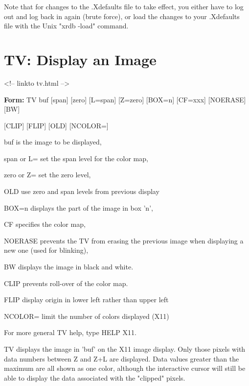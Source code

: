 Note that for changes to the .Xdefaults file to take effect, you either
have to log out and log back in again (brute force), or load the changes to
your .Xdefaults file with the Unix "xrdb -load" command.
 
\section{TV: Display an Image}
\begin{rawhtml}
<!-- linkto tv.html -->
\end{rawhtml}
\begin{command}
  \item[\textbf{Form: }TV buf {[span]} {[zero]} {[L=span]} {[Z=zero]} 
       {[BOX=n]} {[CF=xxx]} {[NOERASE]} {[BW]}\hfill]{}
  \item[{[CLIP]} {[FLIP]} {[OLD]} {[NCOLOR=]}\hfill]{}
  \item[buf]{is the image to be displayed,}
  \item[span or L=]{set the span level for the color map,}
  \item[zero or Z=]{set the zero level,}
  \item[OLD]{use zero and span levels from previous display}
  \item[BOX=n]{displays the part of the image in box 'n',}
  \item[CF]{specifies the color map,}
  \item[NOERASE]{prevents the TV from erasing the previous image
       when displaying a new one (used for blinking),}
  \item[BW]{displays the image in black and white.}
  \item[CLIP]{prevents roll-over of the color map.}
  \item[FLIP]{display origin in lower left rather than upper left}
  \item[NCOLOR=]{limit the number of colors displayed (X11)}
\end{command}

For more general TV help, type HELP X11.

TV displays the image in 'buf' on the X11 image display.  Only those pixels
with data numbers between Z and Z+L are displayed.  Data values greater
than the maximum are all shown as one color, although the interactive
cursor will still be able to display the data associated with the "clipped"
pixels.
 
